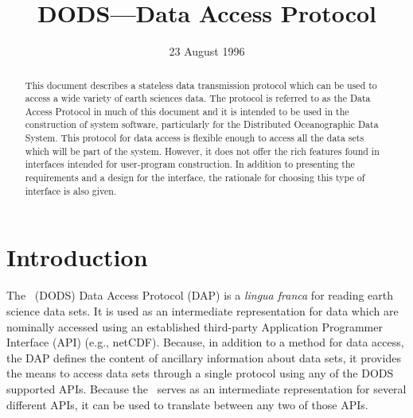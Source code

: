 

%







\title{DODS---Data Access Protocol}
\author{}
\date{23 August 1996} %

\maketitle

\begin{abstract}

  This document describes a stateless data transmission protocol which can be
  used to access a wide variety of earth sciences data. The protocol is
  referred to as the Data Access Protocol in much of this document and it is
  intended to be used in the construction of system software, particularly
  for the Distributed Oceanographic Data System. This protocol for data
  access is flexible enough to access all the data sets which will be part of
  the system. However, it does not offer the rich features found in
  interfaces intended for user-program construction.  In addition to
  presenting the requirements and a design for the interface, the rationale
  for choosing this type of interface is also given.

\end{abstract}



\begin{htmlonly}
\end{htmlonly}

\clearpage

\tableofcontents

\clearpage

\section{Introduction}
\label{introduction}

The \DODS\ (DODS) Data Access Protocol (DAP) is a {\em lingua franca\/} for
reading earth science data sets. It is used as an intermediate representation
for data which are nominally accessed using an established third-party
Application Programmer Interface (API) (e.g., netCDF). Because, in addition
to a method for data access, the DAP defines the content of ancillary
information about data sets, it provides the means to access data sets
through a single protocol using any of the DODS supported APIs. Because the
\dap\ serves as an intermediate representation for several different APIs, it
can be used to translate between any two of those APIs.

